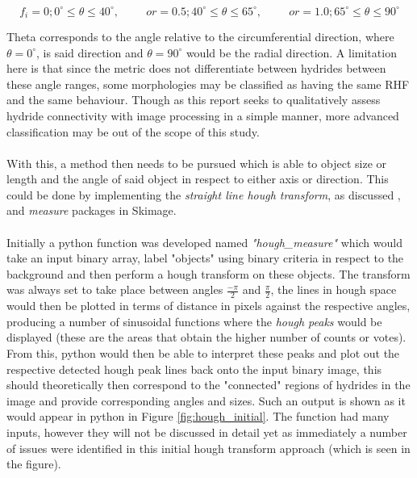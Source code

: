\documentclass{article}
\begin{document}
    \begin{equation}
        f_i = 0; 0^{\circ} \leq \theta \leq 40^{\circ},\hspace{1cm} or = 0.5;  40^{\circ} \leq \theta \leq 65^{\circ}, \hspace{1cm} or = 1.0; 65^{\circ} \leq \theta \leq 90^{\circ}
    \end{equation}
    
    Theta corresponds to the angle relative to the circumferential direction, where $\theta = 0^{\circ}$, is said direction and $\theta = 90^{\circ}$ would be the radial direction. A limitation here is that since the metric does not differentiate between hydrides between these angle ranges, some morphologies may be classified as having the same RHF and the same behaviour. Though as this report seeks to qualitatively assess hydride connectivity with image processing in a simple manner, more advanced classification may be out of the scope of this study.
    \\
    \\
    With this, a method then needs to be pursued which is able to object size or length and the angle of said object in respect to either axis or direction. This could be done by implementing the \textit{straight line hough transform}, as discussed \cite{ScikitimageB}, and \textit{measure} packages in Skimage. 
    \\
    \\
    Initially a python function was developed named \textit{"hough\_measure"} which would take an input binary array, label "objects" using binary criteria in respect to the background and then perform a hough transform on these objects. The transform was always set to take place between angles $\frac{-\pi}{2}$ and $\frac{\pi}{2}$, the lines in hough space would then be plotted in terms of distance in pixels against the respective angles, producing a number of sinusoidal functions where the \textit{hough peaks} would be displayed (these are the areas that obtain the higher number of counts or votes). From this, python would then be able to interpret these peaks and plot out the respective detected hough peak lines back onto the input binary image, this should theoretically then correspond to the "connected" regions of hydrides in the image and provide corresponding angles and sizes. Such an output is shown as it would appear in python in Figure \ref{fig:hough_initial}. The function had many inputs, however they will not be discussed in detail yet as immediately a number of issues were identified in this initial hough transform approach (which is seen in the figure).
    
\end{document}

